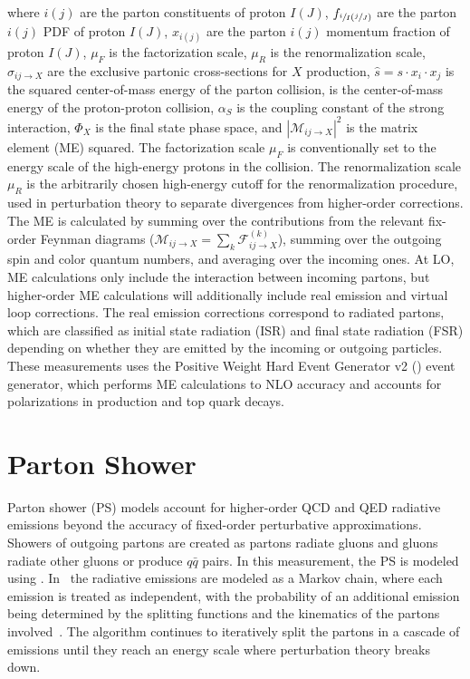 \begin{refsection}
\begin{linenomath*}
\end{linenomath*}
where $i(j)$ are the parton constituents of proton $I(J)$, $f_{{\sfrac{i}{I}}({\sfrac{j}{J}})}$ are the parton $i(j)$ PDF of proton $I(J)$, $x_{i(j)}$ are the parton $i(j)$ momentum fraction of proton $I(J)$, $\mu_F$ is the factorization scale, $\mu_R$ is the renormalization scale, $\sigma_{i j \rightarrow X}$ are the exclusive partonic cross-sections for $X$ production, $\hat{s} = s \cdot x_i \cdot x_j$ is the squared center-of-mass energy of the parton collision, \beamenergy is the center-of-mass energy of the proton-proton collision, $\alpha_S$ is the coupling constant of the strong interaction, $\Phi_X$ is the final state phase space, and $\left\vert \mathcal{M}_{i j \rightarrow X}\right\vert^2$ is the matrix element (ME) squared.
The factorization scale $\mu_F$ is conventionally set to the energy scale of the high-energy protons in the collision.
The renormalization scale $\mu_R$ is the arbitrarily chosen high-energy cutoff for the renormalization procedure, used in perturbation theory to separate divergences from higher-order corrections.
The ME is calculated by summing over the contributions from the relevant fix-order Feynman diagrams ($\mathcal{M}_{i j \rightarrow X}=\sum_k \mathcal{F}_{i j \rightarrow X}^{(k)}$), summing over the outgoing spin and color quantum numbers, and averaging over the incoming ones.
At LO, ME calculations only include the interaction between incoming partons, but higher-order ME calculations will additionally include real emission and virtual loop corrections.
The real emission corrections correspond to radiated partons, which are classified as initial state radiation (ISR) and final state radiation (FSR) depending on whether they are emitted by the incoming or outgoing particles.
These measurements uses the Positive Weight Hard Event Generator v2 (\Powheg) event generator, which performs ME calculations to NLO accuracy and accounts for polarizations in \ttbar production and top quark decays.

\section{Parton Shower}
Parton shower (PS) models account for higher-order QCD and QED radiative emissions beyond the accuracy of fixed-order perturbative approximations.
Showers of outgoing partons are created as partons radiate gluons and gluons radiate other gluons or produce $q\bar{q}$ pairs.
In this measurement, the PS is modeled using \Pythia.
In \Pythia\ the radiative emissions are modeled as a Markov chain, where each emission is treated as independent, with the probability of an additional emission being determined by the splitting functions and the kinematics of the partons involved~\cite{pythia8.3}.
The algorithm continues to iteratively split the partons in a cascade of emissions until they reach an energy scale where perturbation theory breaks down.


\end{refsection}
